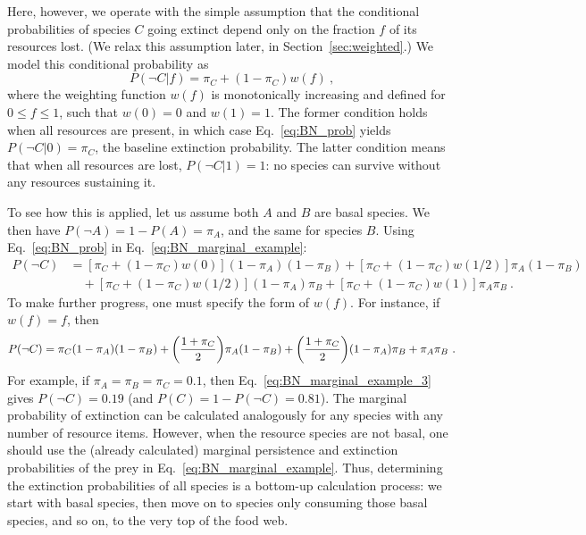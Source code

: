 \documentclass[11pt]{article}
\let\originalleft\left
\let\originalright\right
\renewcommand{\left}{\mathopen{}\mathclose\bgroup\originalleft}
\renewcommand{\right}{\aftergroup\egroup\originalright}
\begin{document}
Here, however, we operate with the simple assumption that the conditional probabilities of species $C$ going extinct depend only on the fraction $f$ of its resources lost. (We relax this assumption later, in Section~\ref{sec:weighted}.) We model this conditional probability as
\begin{equation}
  \label{eq:BN_prob}
  P(\neg C|f) = \pi_C + (1 - \pi_C) w(f) \ ,
\end{equation}
where the weighting function $w(f)$ is monotonically increasing and defined for $0 \le f \le 1$, such that $w(0)=0$ and $w(1)=1$. The former condition holds when all resources are present, in which case Eq.~\ref{eq:BN_prob} yields $P(\neg C|0) = \pi_C$, the baseline extinction probability. The latter condition means that when all resources are lost, $P(\neg C|1) = 1$: no species can survive without any resources sustaining it.

To see how this is applied, let us assume both $A$ and $B$ are basal species. We then have $P(\neg A) = 1 - P(A) = \pi_A$, and the same for species $B$. Using Eq.~\ref{eq:BN_prob} in Eq.~\ref{eq:BN_marginal_example}:
\begin{equation}
  \label{eq:BN_marginal_example_2}
  \begin{split}
    P(\neg C) &= [\pi_C + (1 - \pi_C) w(0)] (1 - \pi_A) (1 - \pi_B) +
    [\pi_C + (1 - \pi_C) w(1/2)] \pi_A (1 - \pi_B) \\ &\quad +
    [\pi_C + (1 - \pi_C) w(1/2)] (1 - \pi_A) \pi_B +
    [\pi_C + (1 - \pi_C) w(1)] \pi_A \pi_B \ .
  \end{split}
\end{equation}
To make further progress, one must specify the form of $w(f)$. For instance, if $w(f)=f$, then
\begin{equation}
  \label{eq:BN_marginal_example_3}
  P(\neg C) = \pi_C (1 - \pi_A) (1 - \pi_B) +
  \left( \frac{1 + \pi_C}{2} \right) \pi_A (1 - \pi_B) +
  \left( \frac{1 + \pi_C}{2} \right) (1 - \pi_A) \pi_B + \pi_A \pi_B \ .
\end{equation}
For example, if $\pi_A = \pi_B = \pi_C = 0.1$, then Eq.~\ref{eq:BN_marginal_example_3} gives $P(\neg C) = 0.19$ (and $P(C) = 1-P(\neg C) = 0.81$). The marginal probability of extinction can be calculated analogously for any species with any number of resource items. However, when the resource species are not basal, one should use the (already calculated) marginal persistence and extinction probabilities of the prey in Eq.~\ref{eq:BN_marginal_example}. Thus, determining the extinction probabilities of all species is a bottom-up calculation process: we start with basal species, then move on to species only consuming those basal species, and so on, to the very top of the food web.
\end{document}
